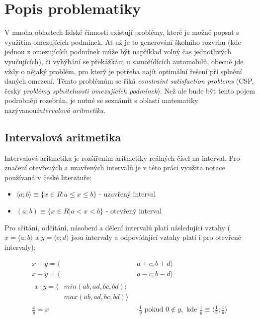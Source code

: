 \chapter{Popis problematiky}
V mnoha oblastech lidské činnosti existují problémy, které je možné popsat s využitím omezujících podmínek. Ať už je to generování školního rozvrhu (kde jednou z omezujících podmínek může být například volný čas jednotlivých vyučujících), či vyhýbání se překážkám u samořídících automobilů, obecně jde vždy o nějaký problém, pro který je potřeba najít optimální řešení při splnění daných omezení. Těmto problémům se říká \emph{constraint satisfaction problems} (CSP, česky \emph{problémy splnitelnosti omezujících podmínek}). Než ale bude být tento pojem podrobněji rozebrán, je nutné se seznámit s oblastí matematiky nazývanou\emph{intervalová aritmetika}.




\section{Intervalová aritmetika}
\label{ch:interval_arithmetic}
Intervalová aritmetika je rozšířením aritmetiky reálných čísel na interval. Pro značení otevřených a uzavřených intervalů je v této práci využita notace používaná v české literatuře:

\begin{itemize}
    \item $\langle a;b \rangle \equiv \{x \in R | a \le x \le b \} $ - uzavřený interval
    \item $(a;b) \equiv \{ x \in R | a < x < b \}$ - otevřený interval
\end{itemize}

Pro sčítání, odčítání, násobení a dělení intervalů platí následující vztahy ($x = \langle a; b \rangle$ a $y = \langle c; d \rangle$ jsou intervaly a odpovídající vztahy platí i pro otevřené intervaly):

\begin{subequations}
\begin{align}
   x+y = \langle & a + c;  b + d \rangle\\
   x-y = \langle & a - c;  b - d \rangle\\
   \begin{split}x  \cdot y = \langle & min(ab, ad, bc, bd); \\ & max(ab, ad, bc, bd) \rangle \end{split}\\
   \frac{x}{y} = x & \cdot \frac{1}{y} \mbox{ pokud } 0 \notin y, \mbox{ kde } \frac{1}{y} \equiv \langle  \frac{1}{b}; \frac{1}{a} \rangle
\end{align}
\end{subequations}

